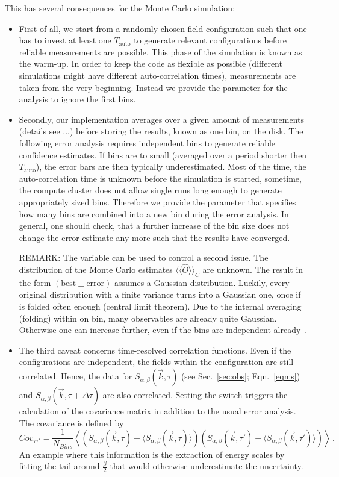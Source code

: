 This has several consequences for the Monte Carlo simulation:
\begin{itemize}
	\item First of all, we start from a randomly chosen field configuration such that one has to invest at least one $T_\mathrm{auto}$ to generate relevant configurations before reliable measurements are possible. This phase of the simulation is known as the warm-up. In order to keep the code as flexible as possible (different simulations might have different auto-correlation times), measurements are taken from the very beginning. Instead we provide the parameter  for the analysis to ignore the first  bins.
	\item Secondly, our implementation averages over a given amount of measurements (details see ...) before storing the results, known as one bin, on the disk. The following error analysis requires independent bins to generate reliable confidence estimates. If bins are to small (averaged over a period shorter then $T_\mathrm{auto}$), the error bars are then typically underestimated. Most of the time, the auto-correlation time is unknown before the simulation is started, sometime, the compute cluster does not allow single runs long enough to generate appropriately sized bins. Therefore we provide the  parameter that specifies how many bins are combined into a new bin during the error analysis. In general, one should check, that a further increase of the bin size does not change the error estimate any more such that the results have converged.
	
	REMARK: The  variable can be used to control a second issue. The distribution of the Monte Carlo estimates $\langle\langle\hat{O}\rangle\rangle_C$ are unknown. The result in the form $(\mathrm{best}\pm \mathrm{error})$ assumes a Gaussian distribution. Luckily, every original distribution with a finite variance turns into a Gaussian one, once if is folded often enough (central limit theorem). Due to the internal averaging (folding) within on bin, many observables are already quite Gaussian. Otherwise one can increase  further, even if the bins are independent already~\cite{Bercx17}.
	\item The third caveat concerns time-resolved correlation functions. Even if the configurations are independent, the fields within the configuration are still correlated. Hence, the data for $S_{\alpha,\beta}(\vec{k},\tau)$ (see Sec.~\ref{sec:obs}; Eqn.~\ref{eqn:s}) and $S_{\alpha,\beta}(\vec{k},\tau+\Delta\tau)$ are also correlated. Setting the switch  triggers the calculation of the covariance matrix in addition to the usual error analysis. The covariance is defined by
	\begin{equation}
		Cov_{\tau \tau'}=\frac{1}{N_{Bins}}\left\langle\left(S_{\alpha,\beta}(\vec{k},\tau)-\langle S_{\alpha,\beta}(\vec{k},\tau)\rangle\right)\left(S_{\alpha,\beta}(\vec{k},\tau')-\langle S_{\alpha,\beta}(\vec{k},\tau')\rangle\right)\right\rangle\,.
	\end{equation}
	An example where this information is the extraction of energy scales by fitting the tail around $\frac{\beta}{2}$ that would otherwise underestimate the uncertainty.
\end{itemize}